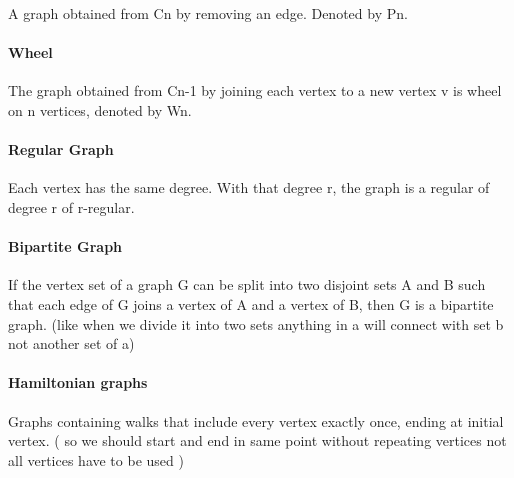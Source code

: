 A graph obtained from Cn by removing an edge. Denoted by Pn.

\hypertarget{wheel}{%
\paragraph{Wheel}\label{wheel}}

The graph obtained from Cn-1 by joining each vertex to a new vertex v is
wheel on n vertices, denoted by Wn.

\hypertarget{regular-graph}{%
\paragraph{Regular Graph}\label{regular-graph}}

Each vertex has the same degree. With that degree r, the graph is a
regular of degree r of r-regular.

\hypertarget{bipartite-graph}{%
\paragraph{Bipartite Graph}\label{bipartite-graph}}

If the vertex set of a graph G can be split into two disjoint sets A and
B such that each edge of G joins a vertex of A and a vertex of B, then G
is a bipartite graph. (like when we divide it into two sets anything in
a will connect with set b not another set of a)

\hypertarget{hamiltonian-graphs}{%
\paragraph{Hamiltonian graphs}\label{hamiltonian-graphs}}

Graphs containing walks that include every vertex exactly once, ending
at initial vertex. ( so we should start and end in same point without
repeating vertices not all vertices have to be used )
